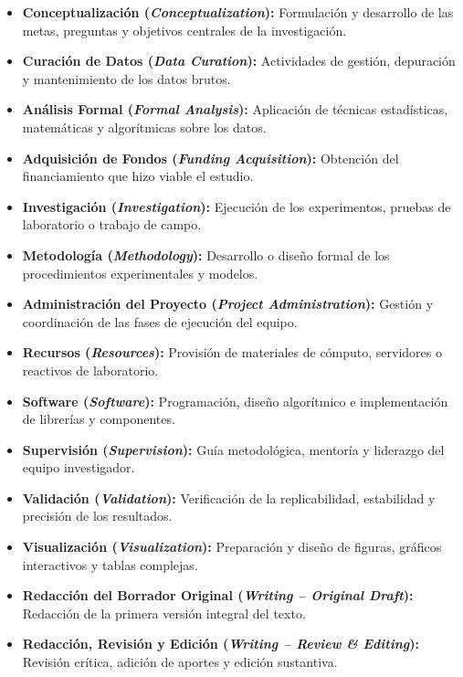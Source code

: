 \begin{itemize}
    \item \textbf{Conceptualización (\textit{Conceptualization}):} Formulación y desarrollo de las metas, preguntas y objetivos centrales de la investigación.
    \item \textbf{Curación de Datos (\textit{Data Curation}):} Actividades de gestión, depuración y mantenimiento de los datos brutos.
    \item \textbf{Análisis Formal (\textit{Formal Analysis}):} Aplicación de técnicas estadísticas, matemáticas y algorítmicas sobre los datos.
    \item \textbf{Adquisición de Fondos (\textit{Funding Acquisition}):} Obtención del financiamiento que hizo viable el estudio.
    \item \textbf{Investigación (\textit{Investigation}):} Ejecución de los experimentos, pruebas de laboratorio o trabajo de campo.
    \item \textbf{Metodología (\textit{Methodology}):} Desarrollo o diseño formal de los procedimientos experimentales y modelos.
    \item \textbf{Administración del Proyecto (\textit{Project Administration}):} Gestión y coordinación de las fases de ejecución del equipo.
    \item \textbf{Recursos (\textit{Resources}):} Provisión de materiales de cómputo, servidores o reactivos de laboratorio.
    \item \textbf{Software (\textit{Software}):} Programación, diseño algorítmico e implementación de librerías y componentes.
    \item \textbf{Supervisión (\textit{Supervision}):} Guía metodológica, mentoría y liderazgo del equipo investigador.
    \item \textbf{Validación (\textit{Validation}):} Verificación de la replicabilidad, estabilidad y precisión de los resultados.
    \item \textbf{Visualización (\textit{Visualization}):} Preparación y diseño de figuras, gráficos interactivos y tablas complejas.
    \item \textbf{Redacción del Borrador Original (\textit{Writing -- Original Draft}):} Redacción de la primera versión integral del texto.
    \item \textbf{Redacción, Revisión y Edición (\textit{Writing -- Review \& Editing}):} Revisión crítica, adición de aportes y edición sustantiva.
\end{itemize}

